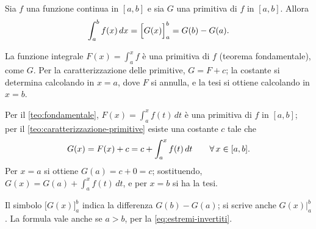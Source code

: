 \begin{teorema}\label{teo:formula-fondamentale}
Sia $f$ una funzione continua in $[a,b]$ e sia $G$ una primitiva di $f$ in $[a,b]$. Allora
\begin{equation}\label{eq:formula-fondamentale}
  \int_{a}^{b}f(x)\,dx=\Bigl[G(x)\Bigr]_{a}^{b}=G(b)-G(a) .
\end{equation}
\end{teorema}

\begin{schema}
\end{schema}

\begin{strategia}
La funzione integrale $F(x)=\int_{a}^{x}f$ è una primitiva di $f$ (teorema fondamentale),
come $G$. Per la caratterizzazione delle primitive, $G=F+c$; la costante si determina
calcolando in $x=a$, dove $F$ si annulla, e la tesi si ottiene calcolando in $x=b$.
\end{strategia}

\begin{dimostrazione}
Per il \cref{teo:fondamentale}, $F(x)=\int_{a}^{x}f(t)\,dt$ è una primitiva di $f$ in
$[a,b]$; per il \cref{teo:caratterizzazione-primitive} esiste una costante $c$ tale che
\[
  G(x)=F(x)+c=c+\int_{a}^{x}f(t)\,dt \qquad\forall\, x\in[a,b] .
\]
Per $x=a$ si ottiene $G(a)=c+0=c$; sostituendo, $G(x)=G(a)+\int_{a}^{x}f(t)\,dt$, e per
$x=b$ si ha la tesi.
\end{dimostrazione}

Il simbolo $\bigl[G(x)\bigr]_{a}^{b}$ indica la differenza $G(b)-G(a)$; si scrive anche
$G(x)\big|_{a}^{b}$. La formula vale anche se $a>b$, per la \eqref{eq:estremi-invertiti}.

